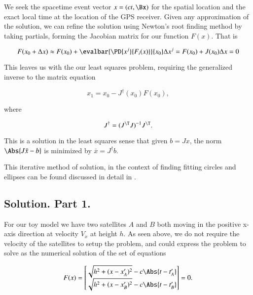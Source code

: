 We seek the spacetime event vector $x = (c t, \Bx)$ for the spatial location and the exact local time at the location of the GPS receiver.  Given any approximation of the solution, we can refine the solution using Newton's root finding method by taking partials, forming the Jacobian matrix for our function $F(x)$.  That is

\begin{equation}\label{eqn:relativisticElectrodynamicsA1:320}
F(x_0 + \Delta x) \approx F(x_0) + \evalbar{\PD{x^j}{F_i(x)}}{x_0} \Delta x^j = F(x_0) + J(x_0) \Delta x = 0
\end{equation}

This leaves us with the our least squares problem, requiring the generalized inverse to the matrix equation

\begin{equation}\label{eqn:relativisticElectrodynamicsA1:330}
x_1 = x_0 - J^\dagger (x_0) F(x_0),
\end{equation}

where 

\begin{equation}\label{eqn:relativisticElectrodynamicsA1:340}
J^\dagger = (J^\T J)^{-1} J^\T.
\end{equation}

This is a solution in the least squares sense that given $b = J x$, the norm $\Abs{ J \bar{x} - b}$ is minimized by $\bar{x} = J^\dagger b$.

This iterative method of solution, in the context of finding fitting circles and ellipses can be found discussed in detail in \cite{gander1994least}.

\subsection{Solution. Part 1.}

For our toy model we have two satellites $A$ and $B$ both moving in the positive x-axis direction at velocity $V_x$ at height $h$.  As seen above, we do not require the velocity of the satellites to setup the problem, and could express the problem to solve as the numerical solution of the set of equations

\begin{equation}\label{eqn:relativisticElectrodynamicsA1:350}
F(x) = 
\begin{bmatrix}
\sqrt{ h^2 + (x - x_A')^2 } - c \Abs{t - t_A'} \\
\sqrt{ h^2 + (x - x_B')^2 } - c \Abs{t - t_B'} \\
\end{bmatrix} = 0.
\end{equation}

